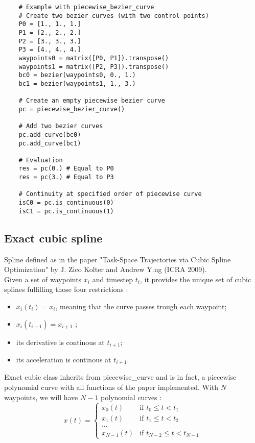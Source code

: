 \documentclass{article}
\begin{document}
    \begin{lstlisting}
    # Example with piecewise_bezier_curve
    # Create two bezier curves (with two control points)
    P0 = [1., 1., 1.]
    P1 = [2., 2., 2.]
    P2 = [3., 3., 3.]
    P3 = [4., 4., 4.]
    waypoints0 = matrix([P0, P1]).transpose()
    waypoints1 = matrix([P2, P3]).transpose()
    bc0 = bezier(waypoints0, 0., 1.)
    bc1 = bezier(waypoints1, 1., 3.)

    # Create an empty piecewise bezier curve
    pc = piecewise_bezier_curve()

    # Add two bezier curves
    pc.add_curve(bc0)
    pc.add_curve(bc1)

    # Evaluation
    res = pc(0.) # Equal to P0
    res = pc(3.) # Equal to P3

    # Continuity at specified order of piecewise curve
    isC0 = pc.is_continuous(0)
    isC1 = pc.is_continuous(1)
    \end{lstlisting}

\subsection{Exact cubic spline}

    Spline defined as in the paper "Task-Space Trajectories via Cubic Spline Optimization" by J. Zico Kolter and Andrew Y.ng (ICRA 2009).\\
    Given a set of waypoints $x_i$ and timestep $t_i$, it provides the unique set of cubic splines fulfilling those four restrictions :
    \begin{itemize}
        \item $x_i(t_i) = x_i$, meaning that the curve passes trough each waypoint;
        \item $x_i(t_{i+1}) = x_{i+1}$ ;
        \item its derivative is continous at $t_{i+1}$;
        \item its acceleration is continous at $t_{i+1}$.
    \end{itemize}
    Exact cubic class inherits from piecewise\_curve and is in fact, a piecewise polynomial curve with all functions of the paper implemented. With $N$ waypoints, we will have $N-1$ polynomial curves :\\
    \begin{equation}
        x(t)=
        \begin{cases}
            x_0(t) &\mbox{if } t_0 \leq t< t_1\\
            x_1(t) &\mbox{if } t_1 \leq t< t_2\\
            ...\\
            x_{N-1}(t) &\mbox{if } t_{N-2} \leq t< t_{N-1}
        \end{cases}
    \end{equation}
\end{document}
